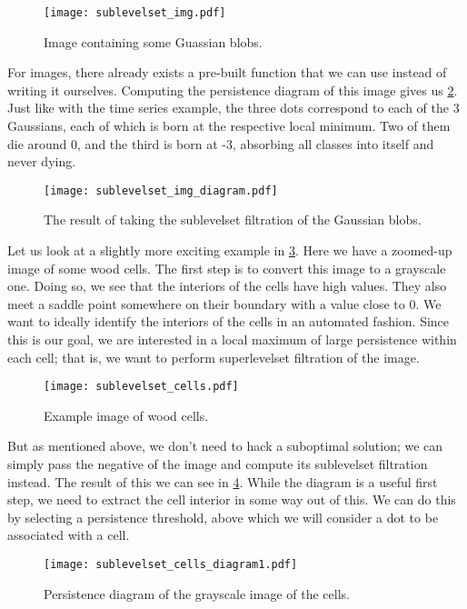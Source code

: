 \begin{figure}[h!]
  \centering
  \texttt{[image: sublevelset\_img.pdf]}
  \caption{Image containing some Guassian blobs.}
  \label{fig:blobs_example}
\end{figure}

For images, there already exists a pre-built function that we can use instead of writing it ourselves. Computing the persistence diagram of this image gives us \ref{fig:blobs_diagram}. Just like with the time series example, the three dots correspond to each of the 3 Gaussians, each of which is born at the respective local minimum. Two of them die around 0, and the third is born at -3, absorbing all classes into itself and never dying.

\begin{figure}[h!]
  \centering
  \texttt{[image: sublevelset\_img\_diagram.pdf]}
  \caption{The result of taking the sublevelset filtration of the Gaussian blobs.}
  \label{fig:blobs_diagram}
\end{figure}

Let us look at a slightly more exciting example in \ref{fig:cells}. Here we have a zoomed-up image of some wood cells. The first step is to convert this image to a grayscale one. Doing so, we see that the interiors of the cells have high values. They also meet a saddle point somewhere on their boundary with a value close to 0. We want to ideally identify the interiors of the cells in an automated fashion. Since this is our goal, we are interested in a local maximum of large persistence within each cell; that is, we want to perform superlevelset filtration of the image.

\begin{figure}[h!]
  \centering
  \texttt{[image: sublevelset\_cells.pdf]}
  \caption{Example image of wood cells.}
  \label{fig:cells}
\end{figure}

But as mentioned above, we don't need to hack a suboptimal solution; we can simply pass the negative of the image and compute its sublevelset filtration instead. The result of this we can see in \ref{fig:cells_diagram1}. While the diagram is a useful first step, we need to extract the cell interior in some way out of this. We can do this by selecting a persistence threshold, above which we will consider a dot to be associated with a cell.

\begin{figure}[h!]
  \centering
  \texttt{[image: sublevelset\_cells\_diagram1.pdf]}
  \caption{Persistence diagram of the grayscale image of the cells.}
  \label{fig:cells_diagram1}
\end{figure}


